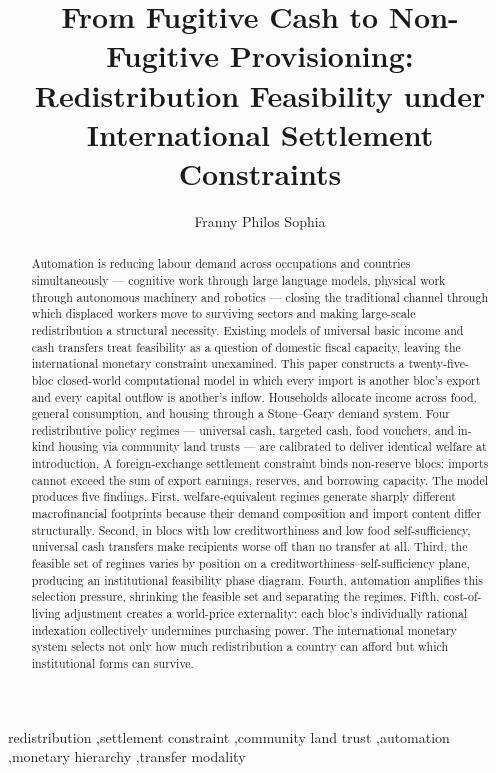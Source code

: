 \documentclass[preprint,review,12pt]{elsarticle}
\begin{document}
\begin{frontmatter}

\title{From Fugitive Cash to Non-Fugitive Provisioning:\\
Redistribution Feasibility under International Settlement Constraints}

\author[elanare]{Franny Philos Sophia}

\begin{abstract}
Automation is reducing labour demand across occupations and countries simultaneously --- cognitive work through large language models, physical work through autonomous machinery and robotics --- closing the traditional channel through which displaced workers move to surviving sectors and making large-scale redistribution a structural necessity. Existing models of universal basic income and cash transfers treat feasibility as a question of domestic fiscal capacity, leaving the international monetary constraint unexamined. This paper constructs a twenty-five-bloc closed-world computational model in which every import is another bloc's export and every capital outflow is another's inflow. Households allocate income across food, general consumption, and housing through a Stone--Geary demand system. Four redistributive policy regimes --- universal cash, targeted cash, food vouchers, and in-kind housing via community land trusts --- are calibrated to deliver identical welfare at introduction. A foreign-exchange settlement constraint binds non-reserve blocs: imports cannot exceed the sum of export earnings, reserves, and borrowing capacity. The model produces five findings. First, welfare-equivalent regimes generate sharply different macrofinancial footprints because their demand composition and import content differ structurally. Second, in blocs with low creditworthiness and low food self-sufficiency, universal cash transfers make recipients worse off than no transfer at all. Third, the feasible set of regimes varies by position on a creditworthiness--self-sufficiency plane, producing an institutional feasibility phase diagram. Fourth, automation amplifies this selection pressure, shrinking the feasible set and separating the regimes. Fifth, cost-of-living adjustment creates a world-price externality: each bloc's individually rational indexation collectively undermines purchasing power. The international monetary system selects not only how much redistribution a country can afford but which institutional forms can survive.
\end{abstract}


\begin{keyword}
redistribution \sep settlement constraint \sep community land trust \sep automation \sep monetary hierarchy \sep transfer modality
\end{keyword}

\end{frontmatter}
\end{document}
